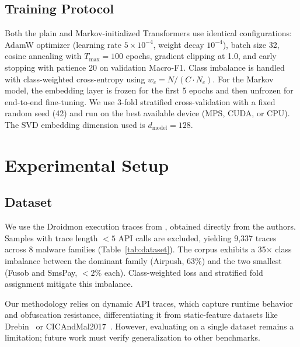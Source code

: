 \documentclass[12pt]{report}
\begin{document}
\subsection{Training Protocol}
Both the plain and Markov-initialized Transformers use identical
configurations: AdamW optimizer (learning rate $5 \times 10^{-4}$,
weight decay $10^{-4}$), batch size 32, cosine annealing with
$T_{\max}=100$ epochs, gradient clipping at 1.0, and early stopping with
patience 20 on validation Macro-F1. Class imbalance is handled with
class-weighted cross-entropy using $w_c = N / (C \cdot N_c)$. For the
Markov model, the embedding layer is frozen for the first 5 epochs and
then unfrozen for end-to-end fine-tuning.
We use 3-fold stratified cross-validation with a fixed random seed (42)
and run on the best available device (MPS, CUDA, or CPU). The SVD
embedding dimension used is $d_{\text{model}}=128$.

\section{Experimental Setup}
\label{sec:setup}

\subsection{Dataset}
We use the Droidmon execution traces from \citet{dangelo2023kspaced}, obtained directly from the authors.
Samples with trace length $< 5$ API calls are excluded, yielding 9,337
traces across 8 malware families (Table~\ref{tab:dataset}). The corpus
exhibits a 35$\times$ class imbalance between the dominant family
(Airpush, 63\%) and the two smallest (Fusob and SmsPay, $<2\%$ each).
Class-weighted loss and stratified fold assignment mitigate this imbalance.

Our methodology relies on dynamic API traces, which capture runtime behavior and obfuscation resistance, differentiating it from static-feature datasets like Drebin~\citep{drebin2014} or CICAndMal2017~\citep{lashkari2018cicandmal2017}. However, evaluating on a single dataset remains a limitation; future work must verify generalization to other benchmarks.
\end{document}
